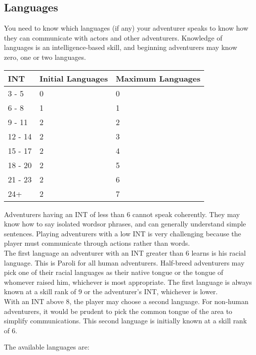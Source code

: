 \begin{multicols*}{2}
\section{Languages}
\label{create-language}
You need to know which languages (if any) your adventurer speaks to know how they can communicate with actors and other adventurers. Knowledge of languages is an intelligence-based skill, and beginning adventurers may know zero, one or two languages.
\begin{tcolorbox}[breakable,boxrule=0pt]
\begin{tabular}{l l l}
INT & Initial Languages & Maximum Languages\\
\midrule
3 - 5 & 0 & 0\\
6 - 8 & 1 & 1\\
9 - 11 & 2 & 2\\
12 - 14 & 2 & 3\\
15 - 17 & 2 & 4\\
18 - 20 & 2 & 5\\
21 - 23 & 2 & 6\\
24+ & 2 & 7\\
\end{tabular}
\end{tcolorbox}
Adventurers having an INT of less than 6 cannot speak coherently. They may know how to say isolated wordsor phrases, and can generally understand simple sentences. Playing adventurers with a low INT is very challenging because the player must communicate through actions rather than words. \\
The first language an adventurer with an INT greater than 6 learns is his racial language. This is Paroli for all human adventurers. Half-breed adventurers may pick one of their racial languages as their native tongue or the tongue of whomever raised him, whichever is most appropriate. The first language is always known at a skill rank of 9 or the adventurer’s INT, whichever is lower.\\
With an INT above 8, the player may choose a second language. For non-human adventurers, it would be prudent to pick the common tongue of the area to simplify communications. This second language is initially known at a skill rank of 6.

The available languages are:


\end{multicols*}
